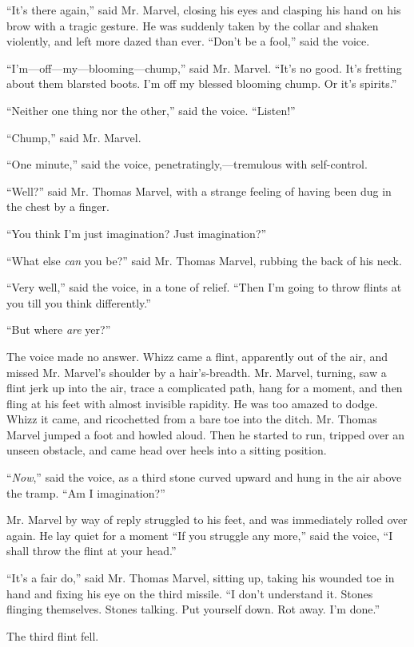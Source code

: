 “It’s there again,” said Mr. Marvel, closing his eyes and clasping his hand on his brow with a tragic gesture. He was suddenly taken by the collar and shaken violently, and left more dazed than ever. “Don’t be a fool,” said the voice.

“I’m—off—my—blooming—chump,” said Mr. Marvel. “It’s no good. It’s fretting about them blarsted boots. I’m off my blessed blooming chump. Or it’s spirits.”

“Neither one thing nor the other,” said the voice. “Listen!”

“Chump,” said Mr. Marvel.

“One minute,” said the voice, penetratingly,—tremulous with self-control.

“Well?” said Mr. Thomas Marvel, with a strange feeling of having been dug in the chest by a finger.

“You think I’m just imagination? Just imagination?”

“What else \emph{can} you be?” said Mr. Thomas Marvel, rubbing the back of his neck.

“Very well,” said the voice, in a tone of relief. “Then I’m going to throw flints at you till you think differently.”

“But where \emph{are} yer?”

The voice made no answer. Whizz came a flint, apparently out of the air, and missed Mr. Marvel’s shoulder by a hair’s-breadth. Mr. Marvel, turning, saw a flint jerk up into the air, trace a complicated path, hang for a moment, and then fling at his feet with almost invisible rapidity. He was too amazed to dodge. Whizz it came, and ricochetted from a bare toe into the ditch. Mr. Thomas Marvel jumped a foot and howled aloud. Then he started to run, tripped over an unseen obstacle, and came head over heels into a sitting position.

“\emph{Now},” said the voice, as a third stone curved upward and hung in the air above the tramp. “Am I imagination?”

Mr. Marvel by way of reply struggled to his feet, and was immediately rolled over again. He lay quiet for a moment “If you struggle any more,” said the voice, “I shall throw the flint at your head.”

“It’s a fair do,” said Mr. Thomas Marvel, sitting up, taking his wounded toe in hand and fixing his eye on the third missile. “I don’t understand it. Stones flinging themselves. Stones talking. Put yourself down. Rot away. I’m done.”

The third flint fell.

